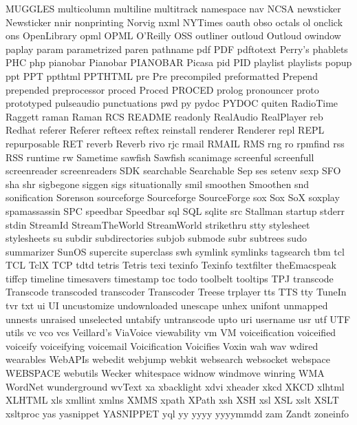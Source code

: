 MUGGLES
multicolumn
multiline
multitrack
namespace
nav
NCSA
newsticker
Newsticker
nnir
nonprinting
Norvig
nxml
NYTimes
oauth
obso
octals
ol
onclick
ons
OpenLibrary
opml
OPML
O'Reilly
OSS
outliner
outloud
Outloud
owindow
paplay
param
parametrized
paren
pathname
pdf
PDF
pdftotext
Perry's
phablets
PHC
php
pianobar
Pianobar
PIANOBAR
Picasa
pid
PID
playlist
playlists
popup
ppt
PPT
ppthtml
PPTHTML
pre
Pre
precompiled
preformatted
Prepend
prepended
preprocessor
proced
Proced
PROCED
prolog
pronouncer
proto
prototyped
pulseaudio
punctuations
pwd
py
pydoc
PYDOC
quiten
RadioTime
Raggett
raman
Raman
RCS
README
readonly
RealAudio
RealPlayer
reb
Redhat
referer
Referer
refteex
reftex
reinstall
renderer
Renderer
repl
REPL
repurposable
RET
reverb
Reverb
rivo
rjc
rmail
RMAIL
RMS
rng
ro
rpmfind
rss
RSS
runtime
rw
Sametime
sawfish
Sawfish
scanimage
screenful
screenfull
screenreader
screenreaders
SDK
searchable
Searchable
Sep
ses
setenv
sexp
SFO
sha
shr
sigbegone
siggen
sigs
situationally
smil
smoothen
Smoothen
snd
sonification
Sorenson
sourceforge
Sourceforge
SourceForge
sox
Sox
SoX
soxplay
spamassassin
SPC
speedbar
Speedbar
sql
SQL
sqlite
src
Stallman
startup
stderr
stdin
StreamId
StreamTheWorld
StreamWorld
strikethru
stty
stylesheet
stylesheets
su
subdir
subdirectories
subjob
submode
subr
subtrees
sudo
summarizer
SunOS
supercite
superclass
swh
symlink
symlinks
tagsearch
tbm
tcl
TCL
TclX
TCP
tdtd
tetris
Tetris
texi
texinfo
Texinfo
textfilter
theEmacspeak
tiffcp
timeline
timesavers
timestamp
toc
todo
toolbelt
tooltips
TPJ
transcode
Transcode
transcoded
transcoder
Transcoder
Treese
trplayer
tts
TTS
tty
TuneIn
tvr
txt
ui
UI
uncustomize
undownloaded
unescape
unhex
unifont
unmapped
unnests
unraised
unselected
untabify
untranscode
upto
uri
username
usr
utf
UTF
utils
vc
vco
vcs
Veillard's
ViaVoice
viewability
vm
VM
voiceification
voiceified
voiceify
voiceifying
voicemail
Voicification
Voicifies
Voxin
wah
wav
wdired
wearables
WebAPIs
webedit
webjump
webkit
websearch
websocket
webspace
WEBSPACE
webutils
Wecker
whitespace
widnow
windmove
winring
WMA
WordNet
wunderground
wvText
xa
xbacklight
xdvi
xheader
xkcd
XKCD
xlhtml
XLHTML
xls
xmllint
xmlns
XMMS
xpath
XPath
xsh
XSH
xsl
XSL
xslt
XSLT
xsltproc
yas
yasnippet
YASNIPPET
yql
yy
yyyy
yyyymmdd
zam
Zandt
zoneinfo
